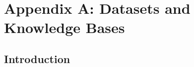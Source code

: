 
\chapter{Appendix A: Datasets and Knowledge Bases}
\label{appendix:datasets}

\section{Introduction}
\label{appendix:datasets:intro}

 